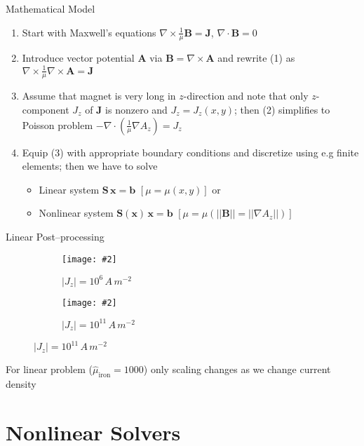 \documentclass{beamer}
\newcommand{\includegraphicsw}[2][1.]{\texttt{[image: \#2]}}
\newcommand{\vect}[1]{\boldsymbol{\mathbf{#1}}}
\begin{document}
	\begin{frame}{Mathematical Model}
		\begin{enumerate}
			\item Start with Maxwell’s equations $\nabla\times\frac{1}{\mu} \vect B = \vect J$, $\nabla\cdot\vect B = 0$
			\item Introduce vector potential $\vect A$ via $\vect B = \nabla\times\vect A$ and rewrite (1) as $\nabla\times\frac{1}{\mu}\nabla\times\vect A = \vect J$
			\item Assume that magnet is very long in $z$-direction and note that only $z$-component $J_z$ of $\vect J$ is nonzero and $J_z = J_z(x, y)$; then (2) simplifies to Poisson problem $-\nabla\cdot(\frac{1}{\mu}\nabla A_z) = J_z$  
			\item Equip (3) with appropriate boundary conditions and discretize using e.g finite elements; then we have to solve
			\begin{itemize}
				\item Linear system $\vect S\,\vect x = \vect b$ $\left[\mu = \mu(x, y)\right]$ or
				\item Nonlinear system $\vect S(\vect x)\,\vect x = \vect b$ $\left[\mu = \mu(||\vect B|| = ||\nabla A_z||)\right]$
			\end{itemize} 
		\end{enumerate}
	\end{frame}

	\begin{frame}{Linear Post–processing}
		\begin{figure}
			\centering
			\caption{$A_z$}
			\begin{subfigure}{.45\linewidth}
				\centering
				\includegraphicsw{l06.png}
				\caption{$|J_z| = 10^6\,A\,m^{-2}$}
			\end{subfigure}%
			\hfill
			\begin{subfigure}{.45\linewidth}
				\centering
				\includegraphicsw{l11.png}
				\caption{$|J_z| = 10^{11}\,A\,m^{-2}$}
			\end{subfigure}
		\end{figure}
		For linear problem ($\hat\mu_{\text{iron}} = 1000$) only scaling changes as we change current density
	\end{frame}
	
	\section{Nonlinear Solvers}
	
\end{document}
